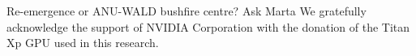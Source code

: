 \documentclass[essd, manuscript]{copernicus}
\begin{document}


\appendixfigures  %

\appendixtables   %







\begin{acknowledgements}
Re-emergence or ANU-WALD bushfire centre? Ask Marta
We gratefully acknowledge the support of NVIDIA Corporation with the donation of the Titan Xp GPU used in this research.
\end{acknowledgements}












\end{document}
